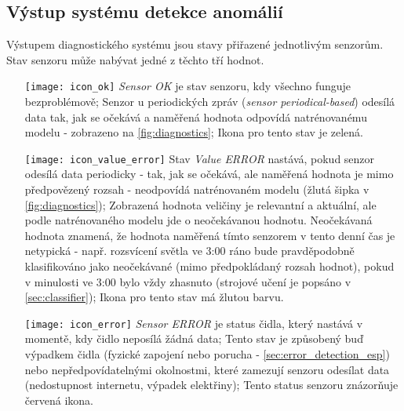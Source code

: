 \subsection*{Výstup systému detekce anomálií} \label{subsec:diagnostics_output}
Výstupem diagnostického systému jsou stavy přiřazené jednotlivým senzorům. Stav senzoru může nabývat jedné z těchto tří hodnot.

\begin{itemize}
  \item [{\texttt{[image: icon\_ok]}}] \textit{Sensor OK} je stav senzoru, kdy všechno funguje bezproblémově; Senzor u periodických zpráv (\textit{sensor periodical-based}) odesílá data tak, jak se očekává a naměřená hodnota odpovídá natrénovanému modelu - zobrazeno na \cref{fig:diagnostics}; Ikona pro tento stav je zelená.
  \item [{\texttt{[image: icon\_value\_error]}}] Stav \textit{Value ERROR} nastává, pokud senzor odesílá data periodicky - tak, jak se očekává, ale naměřená hodnota je mimo předpovězený rozsah - neodpovídá natrénovaném modelu (žlutá šipka v \cref{fig:diagnostics}); Zobrazená hodnota veličiny je relevantní a aktuální, ale podle natrénovaného modelu jde o neočekávanou hodnotu. Neočekávaná hodnota znamená, že  hodnota naměřená tímto senzorem v tento denní čas je netypická - např. rozsvícení světla ve 3:00 ráno bude pravděpodobně klasifikováno jako neočekávané (mimo předpokládaný rozsah hodnot), pokud v minulosti ve 3:00 bylo vždy zhasnuto (strojové učení je popsáno v \cref{sec:classifier}); Ikona pro tento stav má žlutou barvu.
  \item [{\texttt{[image: icon\_error]}}] \textit{Sensor ERROR} je status čidla, který nastává v momentě, kdy čidlo neposílá žádná data; Tento stav je způsobený buď výpadkem čidla (fyzické zapojení nebo porucha - \cref{sec:error_detection_esp}) nebo nepředpovídatelnými okolnostmi, které zamezují senzoru odesílat data (nedostupnost internetu, výpadek elektřiny); Tento status senzoru znázorňuje červená ikona.
\end{itemize}

